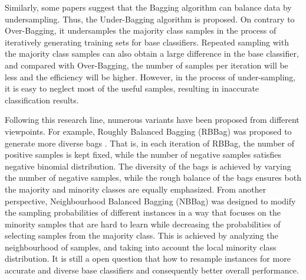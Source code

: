 
Similarly, some papers suggest that the Bagging algorithm can balance data by undersampling. Thus, the Under-Bagging \cite{ref_22} algorithm is proposed. On contrary to Over-Bagging, it undersamples the majority class samples in the process of iteratively generating training sets for base classifiers. Repeated sampling with the majority class samples can also obtain a large difference in the base classifier, and compared with Over-Bagging, the number of samples per iteration will be less and the efficiency will be higher. However, in the process of under-sampling, it is easy to neglect most of the useful samples, resulting in inaccurate classification results.


Following this research line, numerous variants have been proposed from different viewpoints. For example, Roughly Balanced Bagging (RBBag) was proposed to generate more diverse bags \cite{hido2009roughly}. 
That is, in each iteration of RBBag, the number of positive samples is kept fixed, while the number of negative samples  satisfies negative binomial distribution. The diversity of the bags is achieved by varying the number of negative samples, while the rough balance of the bags ensures both the majority and minority classes are equally emphasized. 
From another perspective, Neighbourhood Balanced Bagging (NBBag) \cite{blaszczynski2015neighbourhood} was designed to modify the sampling probabilities of different instances in a way that focuses on the minority samples that are hard to learn while decreasing the probabilities of selecting samples from the majority class. This is achieved by analyzing the neighbourhood of samples, and taking into account the local minority class distribution. It is still a open question that how to resample instances for more accurate and diverse base classifiers and consequently better overall performance. 

